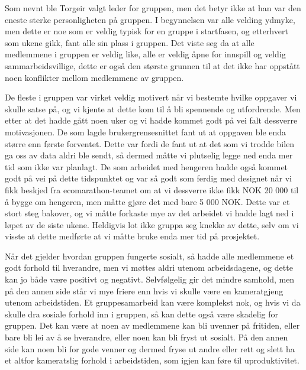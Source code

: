 Som nevnt ble Torgeir valgt leder for gruppen, men det betyr ikke at han var den eneste sterke personligheten på gruppen. I begynnelsen var alle velding ydmyke, men dette er noe som er veldig typisk for en gruppe i startfasen, og etterhvert som ukene gikk, fant alle sin plass i gruppen. Det viste seg da at alle medlemmene i gruppen er veldig like, alle er veldig åpne for innspill og veldig sammarbeidsvillige, dette er også den største grunnen til at det ikke har oppstått noen konflikter mellom medlemmene av gruppen.

De fleste i gruppen var virket veldig motivert når vi bestemte hvilke oppgaver vi skulle satse på, og vi kjente at dette kom til å bli spennende og utfordrende. Men etter at det hadde gått noen uker og vi hadde kommet godt på vei falt dessverre motivasjonen.
De som lagde brukergrensesnittet fant ut at oppgaven ble enda større enn første forventet. Dette var fordi de fant ut at det som vi trodde bilen ga oss av data aldri ble sendt, så dermed måtte vi plutselig legge ned enda mer tid som ikke var planlagt. 
De som arbeidet med hengeren hadde også kommet godt på vei på dette tidspunktet og var så godt som ferdig med designet når vi fikk beskjed fra ecomarathon-teamet om at vi dessverre ikke fikk NOK 20 000 til å bygge om hengeren, men måtte gjøre det med bare 5 000 NOK. Dette var et stort steg bakover, og vi måtte forkaste mye av det arbeidet vi hadde lagt ned i løpet av de siste ukene. 
Heldigvis lot ikke gruppa seg knekke av dette, selv om vi visste at dette medførte at vi måtte bruke enda mer tid på prosjektet.

Når det gjelder hvordan gruppen fungerte sosialt, så hadde alle medlemmene et godt forhold til hverandre, men vi møttes aldri utenom arbeidsdagene, og dette kan jo både være positivt og negativt. 
Selvfølgelig gir det mindre samhold, men på den annen side står vi mye friere enn hvis vi skulle være en kameratgjeng utenom arbeidstiden. 
Et gruppesamarbeid kan være komplekst nok, og hvis vi da skulle dra sosiale forhold inn i gruppen, så kan dette også være skadelig for gruppen. 
Det kan være at noen av medlemmene kan bli uvenner på fritiden, eller bare bli lei av å se hverandre, eller noen kan bli fryst ut sosialt. 
På den annen side kan noen bli for gode venner og dermed fryse ut andre eller rett og slett ha et altfor kameratslig forhold i arbeidstiden, som igjen kan føre til uproduktivitet.
